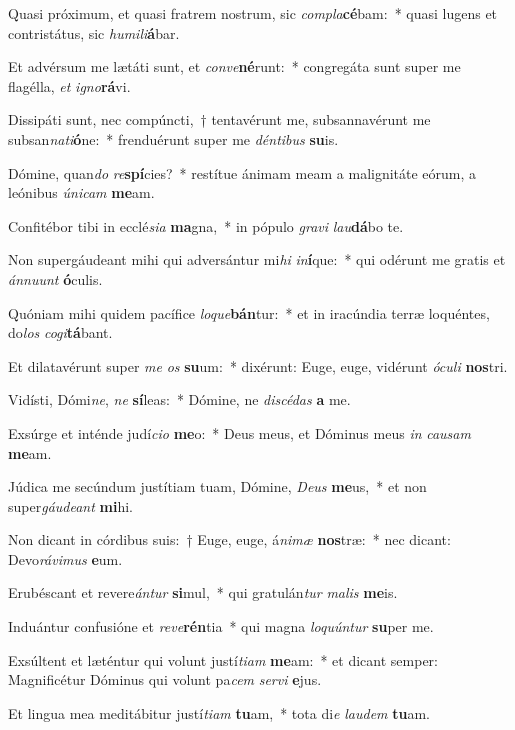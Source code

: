 \item Quasi próximum, et quasi fratrem nostrum, sic \textit{com}\textit{pla}\textbf{cé}bam:~* quasi lugens et contristátus, sic \textit{hu}\textit{mi}\textit{li}\textbf{á}bar.
\item Et advérsum me lætáti sunt, et \textit{con}\textit{ve}\textbf{né}runt:~* congregáta sunt super me flagélla, \textit{et} \textit{i}\textit{gno}\textbf{rá}vi.
\item Dissipáti sunt, nec compúncti,~† tentavérunt me, subsannavérunt me subsan\textit{na}\textit{ti}\textbf{ó}ne:~* frenduérunt super me \textit{dén}\textit{ti}\textit{bus} \textbf{su}is.
\item Dómine, quan\textit{do} \textit{re}\textbf{spí}cies?~* restítue ánimam meam a malignitáte eórum, a leónibus \textit{ú}\textit{ni}\textit{cam} \textbf{me}am.
\item Confitébor tibi in ecclé\textit{si}\textit{a} \textbf{ma}gna,~* in pópulo \textit{gra}\textit{vi} \textit{lau}\textbf{dá}bo te.
\item Non supergáudeant mihi qui adversántur mi\textit{hi} \textit{in}\textbf{í}que:~* qui odérunt me gratis et \textit{án}\textit{nu}\textit{unt} \textbf{ó}culis.
\item Quóniam mihi quidem pacífice \textit{lo}\textit{que}\textbf{bán}tur:~* et in iracúndia terræ loquéntes, do\textit{los} \textit{co}\textit{gi}\textbf{tá}bant.
\item Et dilatavérunt super \textit{me} \textit{os} \textbf{su}um:~* dixérunt: Euge, euge, vidérunt \textit{ó}\textit{cu}\textit{li} \textbf{nos}tri.
\item Vidísti, Dómi\textit{ne}, \textit{ne} \textbf{sí}leas:~* Dómine, ne \textit{di}\textit{scé}\textit{das} \textbf{a} me.
\item Exsúrge et inténde judí\textit{ci}\textit{o} \textbf{me}o:~* Deus meus, et Dóminus meus \textit{in} \textit{cau}\textit{sam} \textbf{me}am.
\item Júdica me secúndum justítiam tuam, Dómine, \textit{De}\textit{us} \textbf{me}us,~* et non super\textit{gáu}\textit{de}\textit{ant} \textbf{mi}hi.
\item Non dicant in córdibus suis:~† Euge, euge, á\textit{ni}\textit{mæ} \textbf{nos}træ:~* nec dicant: Devo\textit{rá}\textit{vi}\textit{mus} \textbf{e}um.
\item Erubéscant et revere\textit{án}\textit{tur} \textbf{si}mul,~* qui gratulán\textit{tur} \textit{ma}\textit{lis} \textbf{me}is.
\item Induántur confusióne et \textit{re}\textit{ve}\textbf{rén}tia~* qui magna \textit{lo}\textit{quún}\textit{tur} \textbf{su}per me.
\item Exsúltent et læténtur qui volunt justí\textit{ti}\textit{am} \textbf{me}am:~* et dicant semper: Magnificétur Dóminus qui volunt pa\textit{cem} \textit{ser}\textit{vi} \textbf{e}jus.
\item Et lingua mea meditábitur justí\textit{ti}\textit{am} \textbf{tu}am,~* tota di\textit{e} \textit{lau}\textit{dem} \textbf{tu}am.
